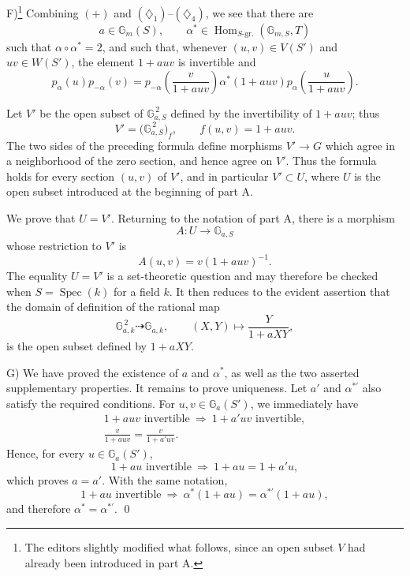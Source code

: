 \textup{F)}\footnote{The editors slightly modified what follows,
since an open subset \(V\) had already been introduced in part A.}
Combining \((+)\) and
\((\diamondsuit_1)\)--\((\diamondsuit_4)\), we see that there are
\[
  a\in\mathbb G_m(S),\qquad
  \alpha^\ast\in
    \operatorname{Hom}_{S\text{-gr.}}(\mathbb G_{m,S},T)
\]
such that \(\alpha\circ\alpha^\ast=2\), and such that, whenever
\((u,v)\in V(S')\) and \(uv\in W(S')\), the element \(1+auv\)
is invertible and
\[
  p_\alpha(u)p_{-\alpha}(v)
   =p_{-\alpha}\left(\frac{v}{1+auv}\right)
      \alpha^\ast(1+auv)
      p_\alpha\left(\frac{u}{1+auv}\right).
\]

Let \(V'\) be the open subset of \(\mathbb G_{a,S}^{\,2}\) defined
by the invertibility of \(1+auv\); thus
\[
  V'=\bigl(\mathbb G_{a,S}^{\,2}\bigr)_f,
  \qquad f(u,v)=1+auv.
\]
The two sides of the preceding formula define morphisms
\(V'\to G\) which agree in a neighborhood of the zero section,
and hence agree on \(V'\). Thus the formula holds for every
section \((u,v)\) of \(V'\), and in particular \(V'\subset U\),
where \(U\) is the open subset introduced at the beginning of
part A.

We prove that \(U=V'\). Returning to the notation of part A, there
is a morphism
\[
  A\colon U\longrightarrow\mathbb G_{a,S}
\]
whose restriction to \(V'\) is
\[
  A(u,v)=v(1+auv)^{-1}.
\]
The equality \(U=V'\) is a set-theoretic question and may therefore
be checked when \(S=\operatorname{Spec}(k)\) for a field \(k\).
It then reduces to the evident assertion that the domain of
definition of the rational map
\[
  \mathbb G_{a,k}^{\,2}\dashrightarrow\mathbb G_{a,k},
  \qquad
  (X,Y)\longmapsto\frac{Y}{1+aXY},
\]
is the open subset defined by \(1+aXY\).

\textup{G)} We have proved the existence of \(a\) and
\(\alpha^\ast\), as well as the two asserted supplementary
properties. It remains to prove uniqueness. Let
\(a'\) and \(\alpha^{\ast\prime}\) also satisfy the required
conditions. For \(u,v\in\mathbb G_a(S')\), we immediately have
\[
\begin{gathered}
  1+auv\text{ invertible}
    \ \Longrightarrow\
  1+a'uv\text{ invertible},\\
  \frac{v}{1+auv}=\frac{v}{1+a'uv}.
\end{gathered}
\]
Hence, for every \(u\in\mathbb G_a(S')\),
\[
  1+au\text{ invertible}
    \ \Longrightarrow\
  1+au=1+a'u,
\]
which proves \(a=a'\). With the same notation,
\[
  1+au\text{ invertible}
    \ \Longrightarrow\
  \alpha^\ast(1+au)=\alpha^{\ast\prime}(1+au),
\]
and therefore \(\alpha^\ast=\alpha^{\ast\prime}\).
\qed

